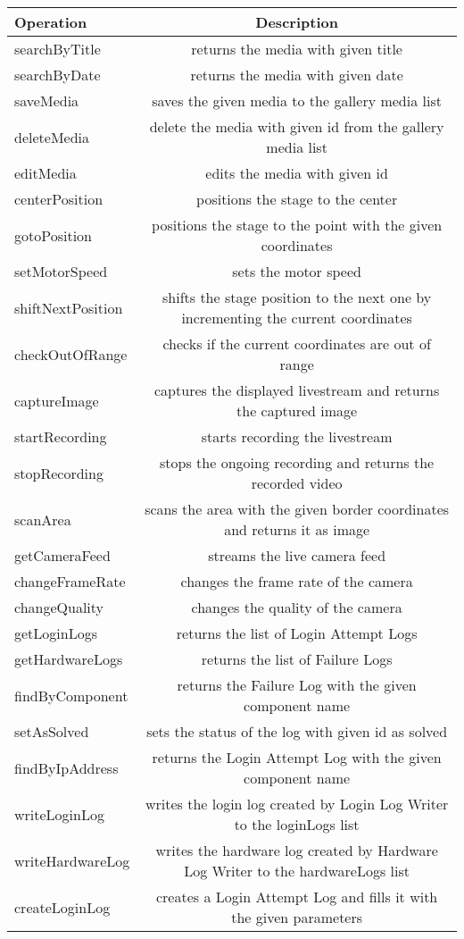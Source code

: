 \begin{table}[H]
	\centering
	\begin{tabular}{|l|C|}
		\hline
		\textbf{Operation}   &  \textbf{Description}\\
		\hline
		searchByTitle   &  returns the media with given title\\
		\hline
		searchByDate   &  returns the media with given date\\
		\hline
		saveMedia  &  saves the given media to the gallery media list\\
		\hline
		deleteMedia   &  delete the media with given id from the gallery media list\\
		\hline
		editMedia   &  edits the media with given id\\
		\hline
		centerPosition   &  positions the stage to the center\\
		\hline
		gotoPosition   &  positions the stage to the point with the given coordinates\\
		\hline
		setMotorSpeed  &  sets the motor speed\\
		\hline
		shiftNextPosition  &  shifts the stage position to the next one by incrementing the current coordinates\\
		\hline
		checkOutOfRange  &  checks if the current coordinates are out of range\\
		\hline
		captureImage  &  captures the displayed livestream and returns the captured image\\
		\hline
		startRecording   &  starts recording the livestream\\
		\hline
		stopRecording   &  stops the ongoing recording and returns the recorded video\\
		\hline
		scanArea & scans the area with the given border coordinates and returns it as image\\
		\hline
		getCameraFeed & streams the live camera feed \\
		\hline
		changeFrameRate & changes the frame rate of the camera\\
		\hline
		changeQuality & changes the quality of the camera\\
		\hline
		getLoginLogs & returns the list of Login Attempt Logs\\
		\hline
		getHardwareLogs & returns the list of Failure Logs\\
\hline
		findByComponent & returns the Failure Log with the given component name\\
\hline
		setAsSolved & sets the status of the log with given id as solved\\
\hline
		findByIpAddress & returns the Login Attempt Log with the given component name\\
\hline
		writeLoginLog & writes the login log created by Login Log Writer to the loginLogs list\\
\hline
		writeHardwareLog & writes the hardware log created by Hardware Log Writer to the hardwareLogs list\\
\hline
		createLoginLog & creates a Login Attempt Log and fills it with the given parameters\\
\hline
	\end{tabular}
\end{table}

